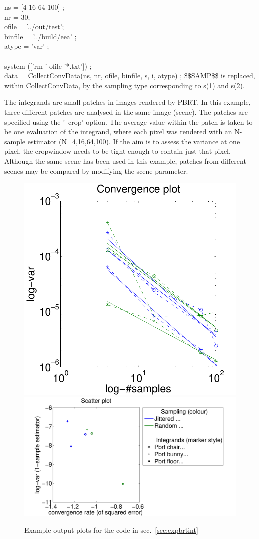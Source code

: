 \begin{tcolorbox}
ns = {[4 16 64 100]} ;\\
nr =  30;\\
ofile = '../out/test';\\
binfile = '../build/eea' ;\\
atype = 'var' ;\\
\\
system (['rm ' ofile '*.txt']) ;\\
data = CollectConvData(ns, nr, ofile, binfile, s, i, atype) ;
\tcblower
  \$\$SAMP\$\$ is replaced, within CollectConvData, by the sampling type corresponding to s(1) and s(2).
\end{tcolorbox}
The integrands are small patches in images rendered by PBRT. In this example, three different patches are analysed in the same image (scene). The patches are specified using the '--crop' option. The average value within the patch is taken to be one evaluation of the integrand, where each pixel was rendered with an N-sample estimator (N=4,16,64,100). If the aim is to assess the variance at one pixel, the cropwindow needs to be tight enough to contain just that pixel. Although the same scene has been used in this example, patches from different scenes may be compared by modifying the scene parameter.
\begin{figure}[htbp]
\includegraphics[width=0.36\linewidth]{figs/pbrt-convs.pdf} 
\includegraphics[width=0.64\linewidth]{figs/pbrt-scatter.pdf}
\caption{\label{fig:expbrtint} Example output plots for the code in sec.~\ref{sec:expbrtint}}
\end{figure}

